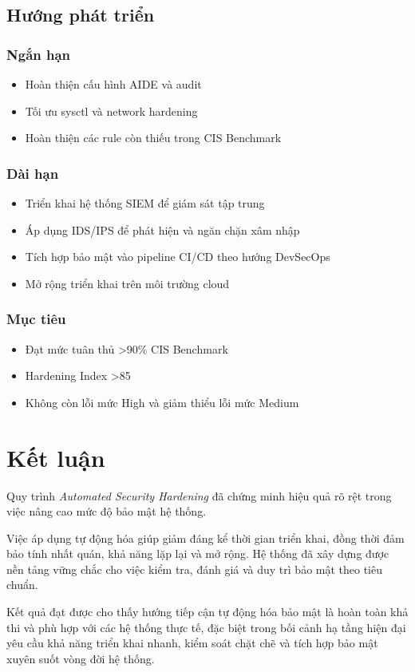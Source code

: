 \subsection{Hướng phát triển}

\subsubsection{Ngắn hạn}
\begin{itemize}
\item Hoàn thiện cấu hình AIDE và audit
\item Tối ưu sysctl và network hardening
\item Hoàn thiện các rule còn thiếu trong CIS Benchmark
\end{itemize}

\subsubsection{Dài hạn}
\begin{itemize}
\item Triển khai hệ thống SIEM để giám sát tập trung
\item Áp dụng IDS/IPS để phát hiện và ngăn chặn xâm nhập
\item Tích hợp bảo mật vào pipeline CI/CD theo hướng DevSecOps
\item Mở rộng triển khai trên môi trường cloud
\end{itemize}

\subsubsection{Mục tiêu}

\begin{itemize}
\item Đạt mức tuân thủ >90\% CIS Benchmark
\item Hardening Index >85
\item Không còn lỗi mức High và giảm thiểu lỗi mức Medium
\end{itemize}

\section{Kết luận}

Quy trình \textit{Automated Security Hardening} đã chứng minh hiệu quả rõ rệt trong việc nâng cao mức độ bảo mật hệ thống.

Việc áp dụng tự động hóa giúp giảm đáng kể thời gian triển khai, đồng thời đảm bảo tính nhất quán, khả năng lặp lại và mở rộng. Hệ thống đã xây dựng được nền tảng vững chắc cho việc kiểm tra, đánh giá và duy trì bảo mật theo tiêu chuẩn.

Kết quả đạt được cho thấy hướng tiếp cận tự động hóa bảo mật là hoàn toàn khả thi và phù hợp với các hệ thống thực tế, đặc biệt trong bối cảnh hạ tầng hiện đại yêu cầu khả năng triển khai nhanh, kiểm soát chặt chẽ và tích hợp bảo mật xuyên suốt vòng đời hệ thống.
